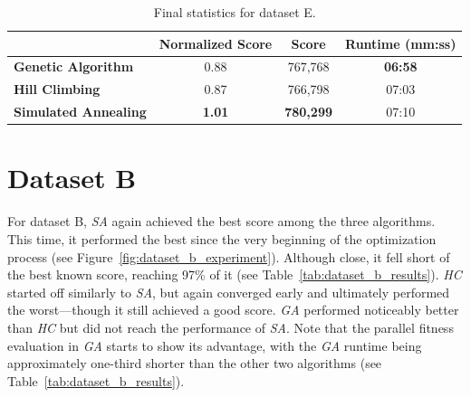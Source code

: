 \bigskip

\begin{table}[h]
\centering\footnotesize\sf
\begin{tabular}{lccc}
\toprule
& Normalized Score & Score & Runtime (mm:ss) \\
\midrule
\textcolor{myblue}{\textbf{Genetic Algorithm}} & 0.88 & 767,768 & \textbf{06:58} \\
\textcolor{myorange}{\textbf{Hill Climbing}} & 0.87 & 766,798 & 07:03 \\
\textcolor{mygreen}{\textbf{Simulated Annealing}} & \textbf{1.01} & \textbf{780,299} & 07:10 \\
\bottomrule
\end{tabular}
\caption[Statistics for dataset E]{
    Final statistics for dataset E.
}
\label{tab:dataset_e_results}
\end{table}

\newpage
\section{Dataset B} \label{sec:dataset_b}

For dataset B, \textit{SA} again achieved the best score among the three algorithms. This time, it performed the best since the very beginning of the optimization process (see Figure~\ref{fig:dataset_b_experiment}). Although close, it fell short of the best known score, reaching 97\% of it (see Table~\ref{tab:dataset_b_results}). \textit{HC} started off similarly to \textit{SA}, but again converged early and ultimately performed the worst---though it still achieved a good score. \textit{GA} performed noticeably better than \textit{HC} but did not reach the performance of \textit{SA}. Note that the parallel fitness evaluation in \textit{GA} starts to show its advantage, with the \textit{GA} runtime being approximately one-third shorter than the other two algorithms (see Table~\ref{tab:dataset_b_results}).

\bigskip


